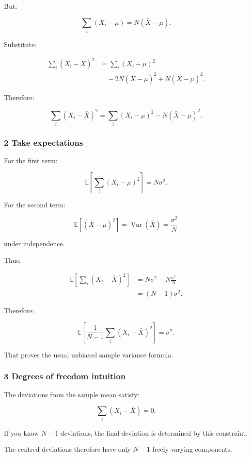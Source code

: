 But:

\[
 \sum_i(X_i-\mu)=N(\bar X-\mu).
\]

Substitute:

\[
 \begin{aligned} \sum_i(X_i-\bar X)^2 &= \sum_i(X_i-\mu)^2\\ &\quad-2N(\bar X-\mu)^2 +N(\bar X-\mu)^2. \end{aligned}
\]

Therefore:

\[
 \boxed{ \sum_i(X_i-\bar X)^2 = \sum_i(X_i-\mu)^2 - N(\bar X-\mu)^2 }.
\]

\subsubsection{2 Take expectations}\label{02-foundations-ii-ch030-take-expectations}

For the first term:

\[
 \mathbb E\left[ \sum_i(X_i-\mu)^2 \right] =N\sigma^2.
\]

For the second term:

\[
 \mathbb E[(\bar X-\mu)^2] = \operatorname{Var}(\bar X) = \frac{\sigma^2}{N}
\]

under independence.

Thus:

\[
 \begin{aligned} \mathbb E\left[ \sum_i(X_i-\bar X)^2 \right] &= N\sigma^2- N\frac{\sigma^2}{N}\\ &=(N-1)\sigma^2. \end{aligned}
\]

Therefore:

\[
 \boxed{ \mathbb E\left[ \frac1{N-1} \sum_i(X_i-\bar X)^2 \right] = \sigma^2 }.
\]

That proves the usual unbiased sample variance formula.

\subsubsection{3 Degrees of freedom intuition}\label{02-foundations-ii-ch030-degrees-of-freedom-intuition}

The deviations from the sample mean satisfy:

\[
 \sum_i(X_i-\bar X)=0.
\]

If you know \(N-1\) deviations, the final deviation is determined by this constraint.

The centred deviations therefore have only \(N-1\) freely varying components.

